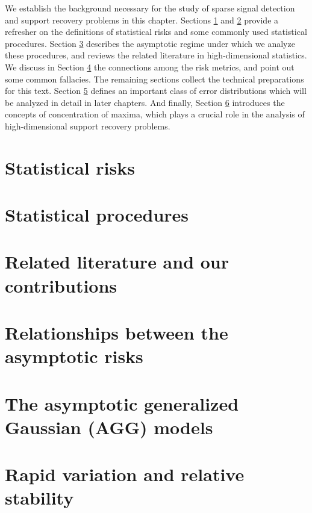 
We establish the background necessary for the study of sparse signal detection and support recovery problems in this chapter.
Sections \ref{sec:risks} and \ref{sec:statistical-procedures} provide a refresher on the definitions of statistical risks and some commonly used statistical procedures.
Section \ref{sec:asymptotics} describes the asymptotic regime under which we analyze these procedures, and reviews the related literature in high-dimensional statistics.
We discuss in Section \ref{sec:risks-relations} the connections among the risk metrics, and point out some common fallacies.
The remaining sections collect the technical preparations for this text.
Section \ref{suppsec:AGG} defines an important class of error distributions which will be analyzed in detail in later chapters. 
And finally, Section \ref{subsec:RS} introduces the concepts of concentration of maxima, which plays a crucial role in the analysis of high-dimensional support recovery problems.


\section{Statistical risks}
\label{sec:risks}


\section{Statistical procedures}
\label{sec:statistical-procedures}


\section{Related literature and our contributions}
\label{sec:asymptotics}


\section{Relationships between the asymptotic risks}
\label{sec:risks-relations}


\section{The asymptotic generalized Gaussian (AGG) models}
\label{suppsec:AGG}


\section{Rapid variation and relative stability}
\label{subsec:RS}

